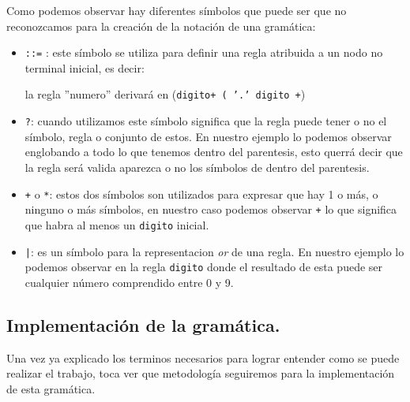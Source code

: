 \documentclass{article}
\begin{document}
    Como podemos observar hay diferentes símbolos que puede ser que no reconozcamos para la creación de la notación de una gramática:

    \begin{itemize}
        \item \texttt{::=} : este símbolo se utiliza para definir una regla atribuida a un nodo no terminal inicial, es decir:

        la regla ''numero'' derivará en (\texttt{digito\space \space + ( '.' \space \space digito  +})
        \item \texttt{?}: cuando utilizamos este símbolo significa que la regla puede tener o no el símbolo, regla o
        conjunto de estos. En nuestro ejemplo lo podemos observar englobando a todo lo que tenemos dentro del parentesis,
        esto querrá decir que la regla será valida aparezca o no los símbolos de dentro del parentesis.
        \item \texttt{+} o \texttt{*}: estos dos símbolos son utilizados para expresar que hay 1 o más, o ninguno o más
        símbolos, en nuestro caso podemos observar \texttt{+} lo que significa que habra al menos un \texttt{digito} inicial.
        \item \texttt{|}: es un símbolo para la representacion \textit{or} de una regla. En nuestro ejemplo lo podemos observar
        en la regla \texttt{digito} donde el resultado de esta puede ser cualquier número comprendido entre 0 y 9.
    \end{itemize}

    \subsection{Implementación de la gramática.}
    Una vez ya explicado los terminos necesarios para lograr entender como se puede realizar el trabajo, toca ver que
    metodología seguiremos para la implementación de esta gramática.
\end{document}
